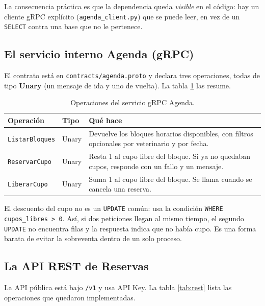 \documentclass[12pt, a4paper]{article}
\begin{document}
La consecuencia práctica es que la dependencia queda \emph{visible} en el
código: hay un cliente gRPC explícito (\texttt{agenda\_client.py}) que se
puede leer, en vez de un \texttt{SELECT} contra una base que no le
pertenece.

\subsection{El servicio interno Agenda (gRPC)}

El contrato está en \texttt{contracts/agenda.proto} y declara tres
operaciones, todas de tipo \textbf{Unary} (un mensaje de ida y uno de
vuelta). La tabla \ref{tab:grpc} las resume.

\begin{table}[H]
\centering
\caption{Operaciones del servicio gRPC Agenda.}
\label{tab:grpc}
\begin{tabular}{@{}p{3.1cm}p{3.6cm}p{6.0cm}@{}}
\toprule
\textbf{Operación} & \textbf{Tipo} & \textbf{Qué hace} \\
\midrule
\texttt{ListarBloques} & Unary &
Devuelve los bloques horarios disponibles, con filtros opcionales por
veterinario y por fecha. \\
\addlinespace
\texttt{ReservarCupo} & Unary &
Resta 1 al cupo libre del bloque. Si ya no quedaban cupos, responde con
un fallo y un mensaje. \\
\addlinespace
\texttt{LiberarCupo} & Unary &
Suma 1 al cupo libre del bloque. Se llama cuando se cancela una reserva. \\
\bottomrule
\end{tabular}
\end{table}

El descuento del cupo no es un \texttt{UPDATE} común: usa la condición
\texttt{WHERE cupos\_libres > 0}. Así, si dos peticiones llegan al mismo
tiempo, el segundo \texttt{UPDATE} no encuentra filas y la respuesta indica
que no había cupo. Es una forma barata de evitar la sobreventa dentro de
un solo proceso.

\subsection{La API REST de Reservas}

La API pública está bajo \texttt{/v1} y usa API Key. La tabla
\ref{tab:rest} lista las operaciones que quedaron implementadas.
\end{document}

